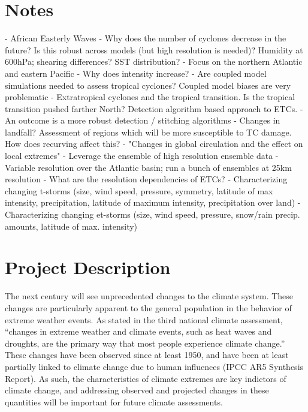 \documentclass[11pt]{article}
\begin{document}
\appendix

\addtocounter{section}{3}

\section*{Notes}

- African Easterly Waves
- Why does the number of cyclones decrease in the future?  Is this robust across models (but high resolution is needed)?  Humidity at 600hPa; shearing differences?  SST distribution?
- Focus on the northern Atlantic and eastern Pacific
- Why does intensity increase?
- Are coupled model simulations needed to assess tropical cyclones?  Coupled model biases are very problematic
- Extratropical cyclones and the tropical transition.  Is the tropical transition pushed farther North?  Detection algorithm based approach to ETCs.
- An outcome is a more robust detection / stitching algorithms
- Changes in landfall?  Assessment of regions which will be more susceptible to TC damage.  How does recurving affect this?
- "Changes in global circulation and the effect on local extremes"
- Leverage the ensemble of high resolution ensemble data
- Variable resolution over the Atlantic basin; run a bunch of ensembles at 25km resolution
- What are the resolution dependencies of ETCs?
- Characterizing changing t-storms (size, wind speed, pressure, symmetry, latitude of max intensity, precipitation, latitude of maximum intensity, precipitation over land)
- Characterizing changing et-storms (size, wind speed, pressure, snow/rain precip. amounts, latitude of max. intensity)
 
\section{Project Description}

The next century will see unprecedented changes to the climate system.  These changes are particularly apparent to the general population in the behavior of extreme weather events. As stated in the third national climate assessment, ``changes in extreme weather and climate events, such as heat waves and droughts, are the primary way that most people experience climate change.''  These changes have been observed since at least 1950, and have been at least partially linked to climate change due to human influences (IPCC AR5 Synthesis Report).  As such, the characteristics of climate extremes are key indictors of climate change, and addressing observed and projected changes in these quantities will be important for future climate assessments.
\end{document}
